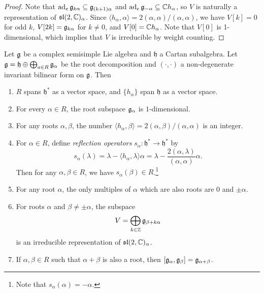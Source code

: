 \begin{proof}
  Note that $\operatorname{ad}_e \mathfrak{g}_{k\alpha} \subseteq \mathfrak{g}_{(k + 1)\alpha}$
  and $\operatorname{ad}_e \mathfrak{g}_{-\alpha} \subseteq \mathbb{C} h_\alpha$, so
  $V$ is naturally a representation of
  $\mathfrak{sl}(2, \mathbb{C})_\alpha$.
  Since $\langle h_\alpha, \alpha \rangle = 2 (\alpha, \alpha) / (\alpha, \alpha)$,
  we have $V[k] = 0$ for odd $k$,
  $V[2k] = \mathfrak{g}_{k\alpha}$ for $k \ne 0$, and
  $V[0] = \mathbb{C} h_\alpha$. Note that
  $V[0]$ is 1-dimensional, which implies
  that $V$ is irreducible by weight
  counting.
\end{proof}

\begin{theorem}\label{thm:structure-semisimple}
  Let $\mathfrak{g}$ be a complex semisimple
  Lie algebra and $\mathfrak{h}$
   a Cartan subalgebra. Let
   $\mathfrak{g} = \mathfrak{h} \oplus \bigoplus_{a \in R} \mathfrak{g}_\alpha$
   be the root decomposition
   and $(\cdot, \cdot)$ a non-degenerate
   invariant bilinear form on $\mathfrak{g}$. Then
   \begin{enumerate}
     \item $R$ spans $\mathfrak{h}^*$
       as a vector space, and
       $\{h_\alpha\}$ span $\mathfrak{h}$ as
       a vector space.
     \item For every
       $\alpha \in R$, the root subspace
       $\mathfrak{g}_\alpha$ is $1$-dimensional.
     \item For any roots $\alpha, \beta$,
       the number $\langle h_\alpha, \beta \rangle = 2 (\alpha, \beta) / (\alpha, \alpha)$
       is an integer.
     \item For $\alpha \in R$, define
       \emph{reflection operators}
       $s_\alpha : \mathfrak{h}^* \to \mathfrak{h}^*$ by
       \[
         s_\alpha(\lambda)
         = \lambda - \langle h_\alpha, \lambda \rangle \alpha
         = \lambda - \frac{2(\alpha, \lambda)}{(\alpha, \alpha)} \alpha.
       \]
       Then for any $\alpha, \beta \in R$,
       we have $s_\alpha(\beta) \in R$.\footnote{Note that $s_\alpha(\alpha) = -\alpha$.}
     \item For any root $\alpha$, the
       only multiples of $\alpha$ which
       are also roots are
       $0$ and $\pm \alpha$.
     \item For roots $\alpha$ and
       $\beta \ne \pm \alpha$, the
       subspace
       \[
         V = \bigoplus_{k \in \mathbb{Z}} \mathfrak{g}_{\beta + k\alpha}
       \]
       is an irreducible representation of
       $\mathfrak{sl}(2, \mathbb{C})_\alpha$.
     \item If $\alpha, \beta \in R$ 
       such that $\alpha + \beta$ is also
       a root, then $[\mathfrak{g}_\alpha, \mathfrak{g}_\beta] = \mathfrak{g}_{\alpha + \beta}$.
   \end{enumerate}
\end{theorem}

